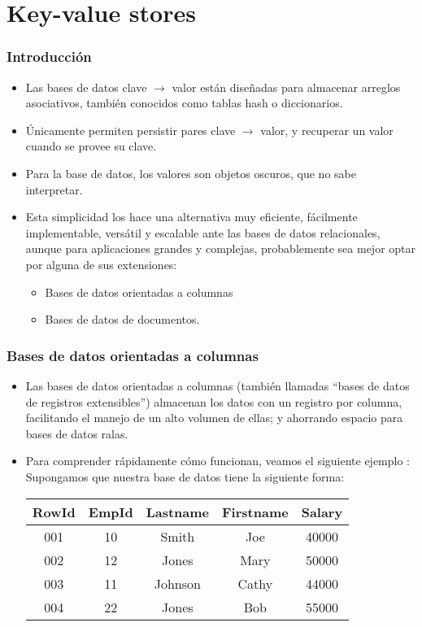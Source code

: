 \section{Key-value stores}
\begin{frame}
\frametitle{Introducción}
\begin{itemize}
\item	Las bases de datos clave $\rightarrow$ valor están diseñadas para almacenar arreglos asociativos, también conocidos como tablas hash o diccionarios. \pause
\item	Únicamente permiten persistir pares clave $\rightarrow$ valor, y recuperar un valor cuando se provee su clave. \pause
\item	Para la base de datos, los valores son objetos oscuros, que no sabe interpretar. \pause
\item	Esta simplicidad los hace una alternativa muy eficiente, fácilmente implementable, versátil y escalable ante las bases de datos relacionales, aunque para aplicaciones grandes y complejas, probablemente sea mejor optar por alguna de sus extensiones: \pause
\begin{itemize}
		\item	Bases de datos orientadas a columnas \pause
		\item	Bases de datos de documentos.
\end{itemize}
\end{itemize}
\end{frame}

\begin{frame}
\frametitle{Bases de datos orientadas a columnas}
\begin{itemize}
\item	Las bases de datos orientadas a columnas (también llamadas ``bases de datos de registros extensibles'') almacenan los datos con un registro por columna, facilitando el manejo de un alto volumen de ellas; y ahorrando espacio para bases de datos ralas. \pause
\item	Para comprender rápidamente cómo funcionan, veamos el siguiente ejemplo : \pause \\
		Supongamos que nuestra base de datos tiene la siguiente forma: \\
		\begin{tabular}{|c|c|c|c|c|}
		\hline
		RowId	&	EmpId	&	Lastname	&	Firstname	&	Salary \\ \hline
		001		&	10		&	Smith		&	Joe			&	40000 \\ \hline
		002		&	12		&	Jones		&	Mary		&	50000 \\ \hline 
		003		&	11		&	Johnson		&	Cathy		&	44000  \\ \hline 
		004		&	22		&	Jones		&	Bob			&	55000  \\ \hline 
		\end{tabular}
\end{itemize}
\end{frame}

